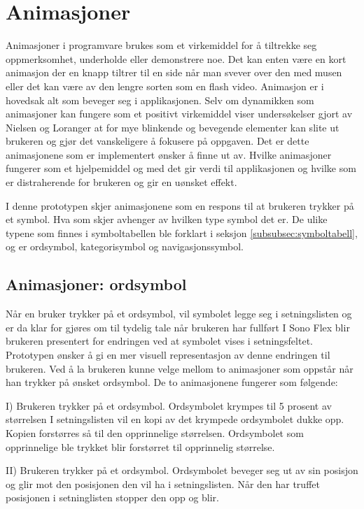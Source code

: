 \documentclass[phd,tocprelim]{cornell}
\begin{document}
\section{Animasjoner}

Animasjoner i programvare brukes som et virkemiddel for å tiltrekke seg oppmerksomhet, underholde eller demonstrere noe. Det kan enten være en kort animasjon der en knapp tiltrer til en side når man svever over den med musen eller det kan være av den lengre sorten som en flash video.  Animasjon er i hovedsak alt som beveger seg i applikasjonen. Selv om dynamikken som animasjoner kan fungere som et positivt virkemiddel viser undersøkelser gjort av Nielsen og Loranger \cite{NielsenBok}  at for mye blinkende og bevegende elementer kan slite ut brukeren og gjør det vanskeligere å fokusere på oppgaven. Det er dette animasjonene som er implementert ønsker å finne ut av. Hvilke animasjoner fungerer som et hjelpemiddel og med det gir verdi til applikasjonen og hvilke som er distraherende for brukeren og gir en uønsket effekt.

I denne prototypen skjer animasjonene som en respons til at brukeren trykker på et symbol. Hva som skjer avhenger av hvilken type symbol det er. De ulike typene som finnes i symboltabellen ble forklart i seksjon \ref{subsubsec:symboltabell}, og er ordsymbol, kategorisymbol og navigasjonssymbol.


\subsection{Animasjoner: ordsymbol}

Når en bruker trykker på et ordsymbol, vil symbolet legge seg i setningslisten og er da klar for gjøres om til tydelig tale når brukeren har fullført 
I Sono Flex blir brukeren presentert for endringen ved at symbolet vises i setningsfeltet. Prototypen ønsker å gi en mer visuell representasjon av denne endringen til brukeren. Ved å la brukeren kunne velge mellom to animasjoner som oppstår når han trykker på ønsket ordsymbol. De to animasjonene fungerer som følgende:


I) Brukeren trykker på et ordsymbol.
   Ordsymbolet krympes til 5 prosent av størrelsen
   I setningslisten vil en kopi av det krympede ordsymbolet dukke opp.
   Kopien forstørres så til den opprinnelige størrelsen.
   Ordsymbolet som opprinnelige ble trykket blir forstørret til opprinnelig størrelse.

   
II) Brukeren trykker på et ordsymbol.
    Ordsymbolet beveger seg ut av sin posisjon og glir mot den posisjonen den vil ha i setningslisten.
    Når den har truffet posisjonen i setninglisten stopper den opp og blir.
\end{document}

